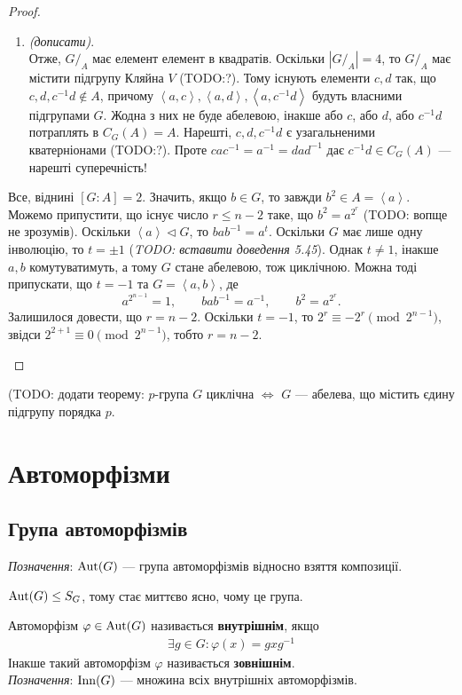 \documentclass{math_library}
\begin{document}
\begin{proof}
\begin{enumerate}[wide=0pt,label={\Roman*.}]
\begin{enumerate}[wide=0pt,label={\roman*.}]
\item \textit{(дописати)}.\\
Отже, $G/_A$ має елемент елемент в квадратів. Оскільки $|G/_A| = 4$, то $G/_A$ має містити підгрупу Кляйна $V$ (TODO:?). Тому існують елементи $c,d$ так, що $c,d,c^{-1}d \notin A$, причому $\left<a,c\right>, \left<a,d\right>, \left<a,c^{-1}d\right>$ будуть власними підгрупами $G$. Жодна з них не буде абелевою, інакше або $c$, або $d$, або $c^{-1}d$ потраплять в $C_G(A) = A$. Нарешті, $c,d,c^{-1}d$ є узагальненими кватерніонами (TODO:?). Проте $cac^{-1} = a^{-1} = dad^{-1}$ дає $c^{-1}d \in C_G(A)$ --- нарешті суперечність!
\end{enumerate}
Все, віднині $[G:A] = 2$. Значить, якщо $b \in G$, то завжди $b^2 \in A = \left<a\right>$. Можемо припустити, що існує число $r \leq n-2$ таке, що $b^2 = a^{2^r}$ (TODO: вопще не зрозумів). Оскільки $\left<a\right> \triangleleft G$, то $bab^{-1} = a^t$. Оскільки $G$ має лише одну інволюцію, то $t = \pm 1$ (\textit{TODO: вставити доведення 5.45}). Однак $t \neq 1$, інакше $a,b$ комутуватимуть, а тому $G$ стане абелевою, тож циклічною. Можна тоді припускати, що $t = -1$ та $G = \left<a,b\right>$, де
\[
a^{2^{n-1}} = 1, \qquad bab^{-1} = a^{-1}, \qquad b^2 = a^{2^r}.
\]
Залишилося довести, що $r = n-2$. Оскільки $t = -1$, то $2^r \equiv -2^{r} \pmod {2^{n-1}}$, звідси $2^{2+1} \equiv 0 \pmod {2^{n-1}}$, тобто $r = n-2$. \qedhere
\end{enumerate}
\end{proof}

(TODO: додати теорему: $p$-група $G$ циклічна $\iff$ $G$ --- абелева, що містить єдину підгрупу порядка $p$.
\newpage

\section{Автоморфізми}
\subsection{Група автоморфізмів}
\textit{Позначення}: $\operatorname{Aut}(G)$ --- група автоморфізмів відносно взяття композиції.

\begin{remark}
$\operatorname{Aut}(G) \leq S_G$, тому стає миттєво ясно, чому це група.
\end{remark}

\begin{definition}
Автоморфізм $\varphi \in \operatorname{Aut}(G)$ називається \textbf{внутрішнім}, якщо
\begin{align*}
\exists g \in G: \varphi(x) = g x g^{-1}
\end{align*}
Інакше такий автоморфізм $\varphi$ називається \textbf{зовнішнім}.
\bigskip \\
\textit{Позначення}: $\operatorname{Inn}(G)$ --- множина всіх внутрішніх автоморфізмів.
\end{definition}
\end{document}
